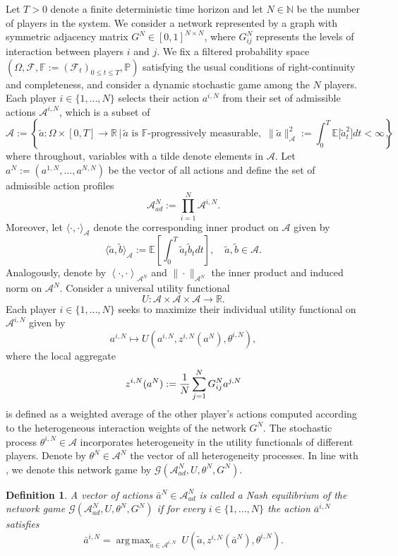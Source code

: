 \documentclass[11pt]{article}
\def\E{{\mathbb{E}}}
\newcommand{\R}{{\mathbb R}}
\DeclareMathOperator*{\argmax}{arg\,max}
\newcommand{\be}{\begin{equation}}
\newcommand{\ee}{\end{equation}}
\newtheorem{definition}[theorem]{Definition}
\numberwithin{equation}{section}
\begin{document}
Let $T>0$ denote a finite deterministic time horizon and let $N\in \mathbb{N}$ be the number of players in the system. We consider a network represented by a graph with symmetric adjacency matrix $G^N\in [0,1]^{N\times N}$, where $G^N_{ij}$ represents the levels of interaction  between players $i$ and $j$. We fix a filtered probability space $(\Omega, \mathcal F, \mathbb F:=(\mathcal F_t)_{0 \leq t \leq T}, \mathbb P)$ satisfying the usual conditions of right-continuity and completeness, and consider a dynamic stochastic game among the $N$ players. Each player $i \in \{1, \ldots, N\}$ selects their action $a^{i,N}$ from their set of admissible actions $\mathcal A^{i,N}$, which is a subset of
\be\label{eq:A}  
  \mathcal A:=\left\{\tilde{a}:\Omega\times [0,T]\to\R \, \Big| \, \tilde{a} \textrm{ is } \mathbb{F}\textrm{-progressively measurable, } \,\|\tilde a\|^2_{\mathcal{A}}:=\int_0^T \mathbb E\big[\tilde{a}_t^2 \big] dt  <\infty \right\},
\ee
where throughout, variables with a tilde denote elements in $\mathcal{A}$. Let $a^N:=(a^{1,N},\ldots, a^{N,N})$ be the vector of all actions and define the set of admissible action profiles
\be\label{eq:AadN}
\mathcal{A}_{ad}^N:=\prod_{i=1}^N\mathcal{A}^{i,N}.
\ee
Moreover, let $\langle\cdot,\cdot\rangle_{\mathcal{A}}$ denote the corresponding inner product on $\mathcal{A}$ given by
\be\label{eq:inner-product-A}
\big\langle  \tilde a,  \tilde b\big\rangle_{\mathcal{A}}:=\E\left[\int_0^T \tilde a_t \tilde b_tdt\right],\quad \tilde a, \tilde b\in\mathcal{A}.
\ee
Analogously, denote by  $\left\langle\cdot,\cdot\right\rangle_{\mathcal{A}^N}$ and $\|\cdot\|_{\mathcal{A}^N}$ the inner product and induced norm on $\mathcal{A}^N$. Consider a universal utility functional 
\be \label{eq:U}
U:\mathcal{A}\times\mathcal{A}\times\mathcal{A}\to\R.
\ee
Each player $i \in \{1, \ldots, N\}$ seeks to maximize their individual utility functional on $\mathcal{A}^{i,N}$ given by
\be \label{eq:Ui}
a^{i,N}\mapsto U\left(a^{i,N},z^{i,N}(a^N),\theta^{i,N}\right),
\ee
where the local aggregate
\be \label{eq:z^{i,N}}
z^{i,N}(a^N):=\frac{1}{N}\sum_{j=1}^NG^N_{ij}a^{j,N}
\ee
is defined as a weighted average of the other player's actions computed according to the heterogeneous interaction weights of the network $G^N$. The stochastic process $\theta^{i,N}\in\mathcal{A}$ incorporates heterogeneity in the utility functionals of different players. Denote by ${\theta}^N\in \mathcal{A}^N$ the vector of all heterogeneity processes. In line with \cite{parise2023graphon}, we denote this network game by $\mathcal{G}(\mathcal A_{ad}^N,U,\theta^N,G^N)$.
\begin{definition} \label{def:Nash-finite-player}
A vector of actions $\bar a^N\in\mathcal{A}_{ad}^N$ is called a Nash equilibrium of the network game $\mathcal{G}(\mathcal A_{ad}^N,U,\theta^N,G^N)$ if for every $i\in \{1,\ldots, N\}$ the action $\bar a^{i,N}$ satisfies 
\be \label{obj-n}
\bar a^{i,N}=\argmax_{\tilde {a}\in\mathcal{A}^{i,N}} \ U\left(\tilde{a}, z^{i,N}(\bar a^N),\theta^{i,N}\right).
\ee
\end{definition}
\end{document}
